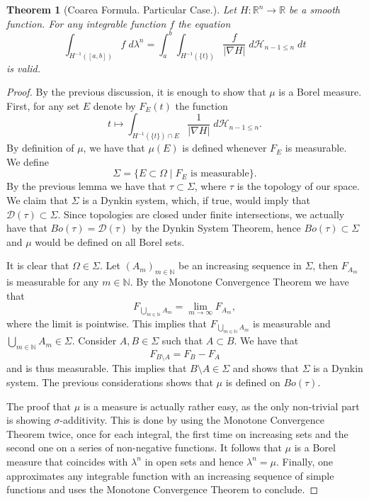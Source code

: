 \documentclass[%
 aip,
 amsmath,amssymb,
 reprint,%
jmp]{revtex4-2}
\newtheorem{theorem}{Theorem}[section]
\begin{document}
\begin{theorem}[Coarea Formula. Particular Case.]
Let $H\colon \mathbb{R}^{n} \to \mathbb{R}$ be a smooth function. For any integrable function $f$ the equation
\begin{equation*}
    \int_{H^{-1}([a,b])} f\;d\lambda^{n} = \int_{a}^{b}\int_{H^{-1}(\{t\})} \frac{f}{|\nabla H|}\;d\mathscr{H}_{n-1\leq n}\;dt
\end{equation*}
is valid.
\end{theorem}
\begin{proof}
By the previous discussion, it is enough to show that $\mu$ is a Borel measure. First, for any set $E$ denote by $F_{E}(t)$ the function
\begin{equation*}
    t \longmapsto \int_{H^{-1}(\{t\})\cap E} \frac{1}{|\nabla H|}\;d\mathscr{H}_{n-1\leq n}.
\end{equation*}
By definition of $\mu$, we have that $\mu(E)$ is defined whenever $F_{E}$ is measurable. We define
\begin{equation*}
    \Sigma = \{E\subset\Omega\;|\;F_{E} \text{ is measurable}\}.
\end{equation*}
By the previous lemma we have that $\tau \subset \Sigma$, where $\tau$ is the topology of our space. We claim that $\Sigma$ is a Dynkin system, which, if true, would imply that $\mathcal{D}(\tau)\subset\Sigma$. Since topologies are closed under finite intersections, we actually have that $Bo(\tau) = \mathcal{D}(\tau)$ by the Dynkin System Theorem, hence $Bo(\tau) \subset \Sigma$ and $\mu$ would be defined on all Borel sets.

It is clear that $\Omega\in\Sigma$. Let $(A_{m})_{m\in\mathbb{N}}$ be an increasing sequence in $\Sigma$, then $F_{A_{m}}$ is measurable for any $m\in\mathbb{N}$. By the Monotone Convergence Theorem we have that
\begin{equation*}
    F_{\bigcup\limits_{m\in\mathbb{N}}A_{m}} = \lim_{m\to\infty}F_{A_{m}},
\end{equation*}
where the limit is pointwise. This implies that $F_{\bigcup\limits_{m\in\mathbb{N}}A_{m}}$ is measurable and $\bigcup\limits_{m\in\mathbb{N}}A_{m}\in\Sigma$. Consider $A,B\in\Sigma$ such that $A\subset B$. We have that
\begin{equation*}
    F_{B\setminus A} = F_{B} - F_{A}
\end{equation*}
and is thus measurable. This implies that $B\setminus A\in\Sigma$ and shows that $\Sigma$ is a Dynkin system. The previous considerations shows that $\mu$ is defined on $Bo(\tau)$.

The proof that $\mu$ is a measure is actually rather easy, as the only non-trivial part is showing $\sigma$-additivity. This is done by using the Monotone Convergence Theorem twice, once for each integral, the first time on increasing sets and the second one on a series of non-negative functions. It follows that $\mu$ is a Borel measure that coincides with $\lambda^{n}$ in open sets and hence $\lambda^{n} = \mu$. Finally, one approximates any integrable function with an increasing sequence of simple functions and uses the Monotone Convergence Theorem to conclude.
\end{proof}
\end{document}
